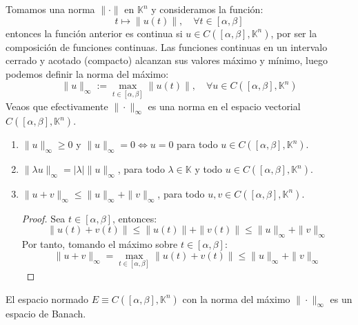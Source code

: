 Tomamos una norma $\lVert \cdot \rVert$ en $\mathbb{K}^n$ y consideramos la función:
\[
    t \mapsto \lVert u(t) \rVert, \quad \forall t \in [\alpha, \beta]
\]
entonces la función anterior es continua si $u \in C([\alpha, \beta], \mathbb{K}^n)$, por ser la composición de funciones continuas. Las funciones continuas en un intervalo cerrado y acotado (compacto) alcanzan sus valores máximo y mínimo, luego podemos definir la norma del máximo:
\[
    \| u \|_{\infty} := \max_{t \in [\alpha, \beta]} \| u(t) \|, \quad \forall u \in C([\alpha, \beta], \mathbb{K}^n)
\]
Veaos que efectivamente $\| \cdot \|_{\infty}$ es una norma en el espacio vectorial $C([\alpha, \beta], \mathbb{K}^n)$.
\begin{enumerate}
    \item $\| u \|_{\infty} \geq 0$ y $\| u \|_{\infty} = 0 \iff u = 0$ para todo $u \in C([\alpha, \beta], \mathbb{K}^n)$.
    \item $\| \lambda u \|_{\infty} = |\lambda| \| u \|_{\infty}$, para todo $\lambda \in \mathbb{K}$ y todo $u \in C([\alpha, \beta], \mathbb{K}^n)$.
    \item $\| u + v \|_{\infty} \leq \| u \|_{\infty} + \| v \|_{\infty}$, para todo $u,v \in C([\alpha, \beta], \mathbb{K}^n)$.
    \begin{proof}
        Sea $t \in [\alpha, \beta]$, entonces:
        \[
            \| u(t) + v(t) \| \leq \| u(t) \| + \| v(t) \| \leq \| u \|_{\infty} + \| v \|_{\infty}
        \]
        Por tanto, tomando el máximo sobre $t \in [\alpha, \beta]$:
        \[
            \| u + v \|_{\infty} = \max_{t \in [\alpha, \beta]} \| u(t) + v(t) \| \leq \| u \|_{\infty} + \| v \|_{\infty}
        \]
    \end{proof}
\end{enumerate}

\begin{teorema}
    El espacio normado $E \equiv C([\alpha, \beta], \mathbb{K}^n)$ con la norma del máximo $\| \cdot \|_{\infty}$ es un espacio de Banach.
\end{teorema}

